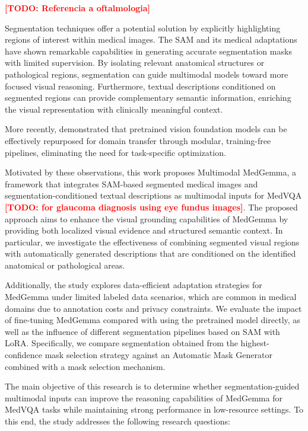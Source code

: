 \documentclass[runningheads]{llncs}
\newcommand{\todo}[1]{\textcolor{red}{\textbf{[TODO: #1]}}}
\begin{document}
\todo{Referencia a oftalmologia}

Segmentation techniques offer a potential solution by explicitly highlighting regions of interest within medical images. The \gls{SAM} and its medical adaptations have shown remarkable capabilities in generating accurate segmentation masks with limited supervision. By isolating relevant anatomical structures or pathological regions, segmentation can guide multimodal models toward more focused visual reasoning. Furthermore, textual descriptions conditioned on segmented regions can provide complementary semantic information, enriching the visual representation with clinically meaningful context.

More recently, \cite{fallas-moya_squeeze_2025,xie-li_simple_2024} demonstrated that pretrained vision foundation models can be effectively repurposed for domain transfer through modular, training-free pipelines, eliminating the need for task-specific optimization.


Motivated by these observations, this work proposes Multimodal MedGemma, a framework that integrates \gls{SAM}-based segmented medical images and segmentation-conditioned textual descriptions as multimodal inputs for \gls{MedVQA} \todo{for glaucoma diagnosis using eye fundus images}. The proposed approach aims to enhance the visual grounding capabilities of MedGemma by providing both localized visual evidence and structured semantic context. In particular, we investigate the effectiveness of combining segmented visual regions with automatically generated descriptions that are conditioned on the identified anatomical or pathological areas.

Additionally, the study explores data-efficient adaptation strategies for MedGemma under limited labeled data scenarios, which are common in medical domains due to annotation costs and privacy constraints. We evaluate the impact of fine-tuning MedGemma compared with using the pretrained model directly, as well as the influence of different segmentation pipelines based on \gls{SAM} with \gls{LoRA}. Specifically, we compare segmentation obtained from the highest-confidence mask selection strategy against an Automatic Mask Generator combined with a mask selection mechanism.

The main objective of this research is to determine whether segmentation-guided multimodal inputs can improve the reasoning capabilities of MedGemma for \gls{MedVQA} tasks while maintaining strong performance in low-resource settings. To this end, the study addresses the following research questions:
\end{document}
